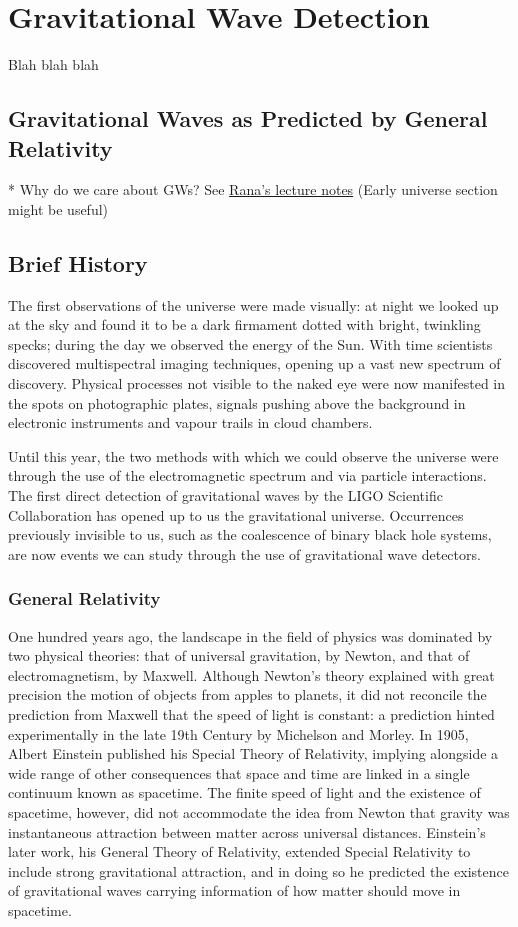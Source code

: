 \chapter{Gravitational Wave Detection}
\label{c:gw-detection}

Blah blah blah

\section{Gravitational Waves as Predicted by General Relativity}
* Why do we care about GWs? See \href{https://github.com/rxa254/StatisticalPhysics/blob/master/LectureNotes/ph2c_2015.pdf}{Rana's lecture notes}  (Early universe section might be useful) 

\section{Brief History}
The first observations of the universe were made visually: at night we looked up at the sky and found it to be a dark firmament dotted with bright, twinkling specks; during the day we observed the energy of the Sun. With time scientists discovered multispectral imaging techniques, opening up a vast new spectrum of discovery. Physical processes not visible to the naked eye were now manifested in the spots on photographic plates, signals pushing above the background in electronic instruments and vapour trails in cloud chambers.

Until this year, the two methods with which we could observe the universe were through the use of the electromagnetic spectrum and via particle interactions. The first direct detection of gravitational waves by the LIGO Scientific Collaboration has opened up to us the gravitational universe. Occurrences previously invisible to us, such as the coalescence of binary black hole systems, are now events we can study through the use of gravitational wave detectors.

\subsection{General Relativity}
One hundred years ago, the landscape in the field of physics was dominated by two physical theories: that of universal gravitation, by Newton, and that of electromagnetism, by Maxwell. Although Newton's theory explained with great precision the motion of objects from apples to planets, it did not reconcile the prediction from Maxwell that the speed of light is constant: a prediction hinted experimentally in the late 19th Century by Michelson and Morley. In 1905, Albert Einstein published his Special Theory of Relativity, implying alongside a wide range of other consequences that space and time are linked in a single continuum known as spacetime. The finite speed of light and the existence of spacetime, however, did not accommodate the idea from Newton that gravity was instantaneous attraction between matter across universal distances. Einstein's later work, his General Theory of Relativity, extended Special Relativity to include strong gravitational attraction, and in doing so he predicted the existence of gravitational waves carrying information of how matter should move in spacetime.

